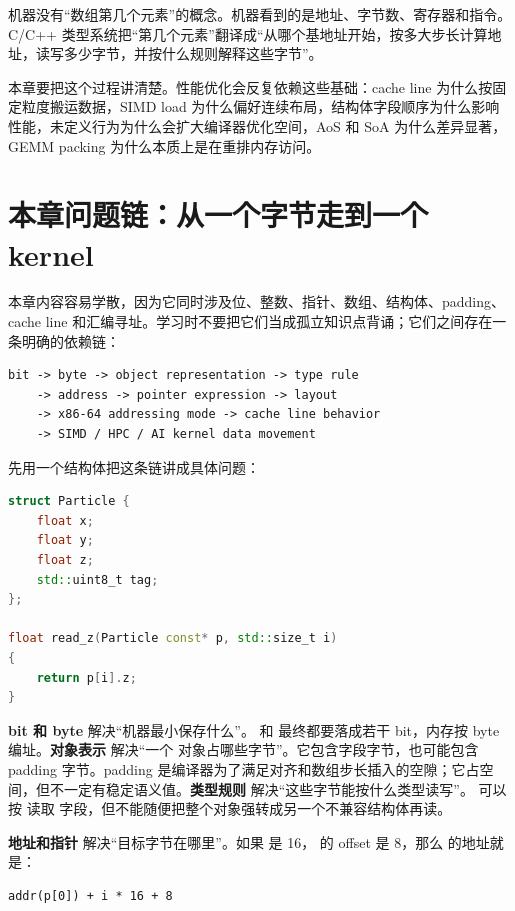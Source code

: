 \begin{keyidea}
机器没有“数组第几个元素”的概念。机器看到的是地址、字节数、寄存器和指令。C/C++ 类型系统把“第几个元素”翻译成“从哪个基地址开始，按多大步长计算地址，读写多少字节，并按什么规则解释这些字节”。
\end{keyidea}

本章要把这个过程讲清楚。性能优化会反复依赖这些基础：cache line 为什么按固定粒度搬运数据，SIMD load 为什么偏好连续布局，结构体字段顺序为什么影响性能，未定义行为为什么会扩大编译器优化空间，AoS 和 SoA 为什么差异显著，GEMM packing 为什么本质上是在重排内存访问。

\section{本章问题链：从一个字节走到一个 kernel}

本章内容容易学散，因为它同时涉及位、整数、指针、数组、结构体、padding、cache line 和汇编寻址。学习时不要把它们当成孤立知识点背诵；它们之间存在一条明确的依赖链：

\begin{lstlisting}
bit -> byte -> object representation -> type rule
    -> address -> pointer expression -> layout
    -> x86-64 addressing mode -> cache line behavior
    -> SIMD / HPC / AI kernel data movement
\end{lstlisting}

先用一个结构体把这条链讲成具体问题：

\begin{lstlisting}[language=C++]
struct Particle {
    float x;
    float y;
    float z;
    std::uint8_t tag;
};

float read_z(Particle const* p, std::size_t i)
{
    return p[i].z;
}
\end{lstlisting}

\textbf{bit 和 byte} 解决“机器最小保存什么”。 和  最终都要落成若干 bit，内存按 byte 编址。\textbf{对象表示} 解决“一个  对象占哪些字节”。它包含字段字节，也可能包含 padding 字节。padding 是编译器为了满足对齐和数组步长插入的空隙；它占空间，但不一定有稳定语义值。\textbf{类型规则} 解决“这些字节能按什么类型读写”。 可以按  读取  字段，但不能随便把整个对象强转成另一个不兼容结构体再读。

\textbf{地址和指针} 解决“目标字节在哪里”。如果  是 16， 的 offset 是 8，那么  的地址就是：

\begin{lstlisting}[numbers=none]
addr(p[0]) + i * 16 + 8
\end{lstlisting}

